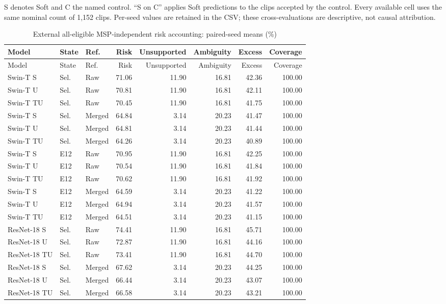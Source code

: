 \documentclass[10pt]{article}
\begin{document}
S denotes Soft and C the named control. ``S on C'' applies Soft predictions to the clips accepted by the control. Every available cell uses the same nominal count of 1,152 clips. Per-seed values are retained in the CSV; these cross-evaluations are descriptive, not causal attribution.
\begin{longtable}{lllrrrrr}
\caption{External all-eligible MSP-independent risk accounting: paired-seed means (\%)}\\
\toprule Model & State & Ref. & Risk & Unsupported & Ambiguity & Excess & Coverage\\\midrule\endfirsthead
\toprule Model & State & Ref. & Risk & Unsupported & Ambiguity & Excess & Coverage\\\midrule\endhead
Swin-T S & Sel. & Raw & 71.06 & 11.90 & 16.81 & 42.36 & 100.00\\
Swin-T U & Sel. & Raw & 70.81 & 11.90 & 16.81 & 42.11 & 100.00\\
Swin-T TU & Sel. & Raw & 70.45 & 11.90 & 16.81 & 41.75 & 100.00\\
Swin-T S & Sel. & Merged & 64.84 & 3.14 & 20.23 & 41.47 & 100.00\\
Swin-T U & Sel. & Merged & 64.81 & 3.14 & 20.23 & 41.44 & 100.00\\
Swin-T TU & Sel. & Merged & 64.26 & 3.14 & 20.23 & 40.89 & 100.00\\
Swin-T S & E12 & Raw & 70.95 & 11.90 & 16.81 & 42.25 & 100.00\\
Swin-T U & E12 & Raw & 70.54 & 11.90 & 16.81 & 41.84 & 100.00\\
Swin-T TU & E12 & Raw & 70.62 & 11.90 & 16.81 & 41.92 & 100.00\\
Swin-T S & E12 & Merged & 64.59 & 3.14 & 20.23 & 41.22 & 100.00\\
Swin-T U & E12 & Merged & 64.94 & 3.14 & 20.23 & 41.57 & 100.00\\
Swin-T TU & E12 & Merged & 64.51 & 3.14 & 20.23 & 41.15 & 100.00\\
ResNet-18 S & Sel. & Raw & 74.41 & 11.90 & 16.81 & 45.71 & 100.00\\
ResNet-18 U & Sel. & Raw & 72.87 & 11.90 & 16.81 & 44.16 & 100.00\\
ResNet-18 TU & Sel. & Raw & 73.41 & 11.90 & 16.81 & 44.70 & 100.00\\
ResNet-18 S & Sel. & Merged & 67.62 & 3.14 & 20.23 & 44.25 & 100.00\\
ResNet-18 U & Sel. & Merged & 66.44 & 3.14 & 20.23 & 43.07 & 100.00\\
ResNet-18 TU & Sel. & Merged & 66.58 & 3.14 & 20.23 & 43.21 & 100.00\\

\end{longtable}
\end{document}
